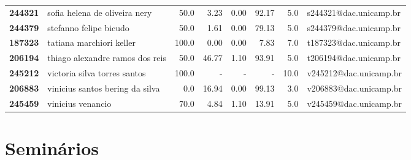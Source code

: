 \documentclass[11pt]{article}
\begin{document}
\begin{center}
\begin{landscape}
\begin{longtable}{llrrrrrl}
\textbf{244321} &         sofia helena de oliveira nery &                  50.0 &        3.23 &        0.00 &       92.17 &                      5.0 &  s244321@dac.unicamp.br \\
\textbf{244379} &                stefanno felipe bicudo &                  50.0 &        1.61 &        0.00 &       79.13 &                      5.0 &  s244379@dac.unicamp.br \\
\textbf{187323} &              tatiana marchiori keller &                 100.0 &        0.00 &        0.00 &        7.83 &                      7.0 &  t187323@dac.unicamp.br \\
\textbf{206194} &       thiago alexandre ramos dos reis &                  50.0 &       46.77 &        1.10 &       93.91 &                      5.0 &  t206194@dac.unicamp.br \\
\textbf{245212} &          victoria silva torres santos &                 100.0 &           - &           - &           - &                     10.0 &  v245212@dac.unicamp.br \\
\textbf{206883} &       vinicius santos bering da silva &                   0.0 &       16.94 &        0.00 &       99.13 &                      3.0 &  v206883@dac.unicamp.br \\
\textbf{245459} &                     vinicius venancio &                  70.0 &        4.84 &        1.10 &       13.91 &                      5.0 &  v245459@dac.unicamp.br \\
\end{longtable}
\end{landscape}\end{center}


\section{Seminários}
\label{sec:org62ac50b}
\end{document}
